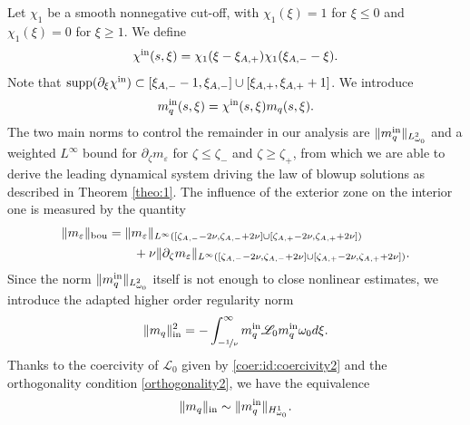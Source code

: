 \documentclass[11pt]{aims}
\theoremstyle{definition}
\newcommand{\ep}{\varepsilon}
\newcommand{\Ls}{\mathscr{L}}
\newcommand{\pa}{\partial}
\newcommand{\inn}{\textup{in}}
\newcommand{\out}{\textup{ex}}
\newcommand{\bd}{\textup{bou}}
\numberwithin{equation}{section}
\begin{document}
Let $\chi_1$ be a smooth nonnegative cut-off, with $\chi_1(\xi)=1$ for $\xi\leq 0$ and $\chi_1(\xi)=0$ for $\xi\geq 1$. We define
$$
 \chi^\inn (s,\xi)=\chi_1(\xi-\xi_{A,+})\chi_1(\xi_{A,-}-\xi).
$$
Note that $\textup{supp}(\pa_\xi \chi^\inn)\subset [\xi_{A,-}-1,\xi_{A,-}]\cup [\xi_{A,+},\xi_{A,+}+1]$. We introduce
\begin{equation}\label{def:chi_inn}
 m_q^\inn (s,\xi) = \chi^\inn (s,\xi) m_q (s,\xi).
\end{equation}
The two main norms to control the remainder in our analysis are $\|m_q^\inn\|_{L^2_{\omega_0}}$ and a weighted $L^\infty$ bound for $\pa_\zeta m_\varepsilon$ for $\zeta\leq \zeta_{-}$ and $\zeta \geq \zeta_+$, from which we are able to derive the leading dynamical system driving the law of blowup solutions as described in Theorem \ref{theo:1}. The influence of the exterior zone on the interior one is measured by the  quantity
\begin{align} \label{def:boundarynorm}
\| m_\varepsilon \|_{\bd}& = \| m_\varepsilon \|_{L^\infty( [\zeta_{A,-}-2\nu,\zeta_{A,-}+2\nu]\cup [\zeta_{A,+}-2\nu,\zeta_{A,+}+2\nu ])}\\
\nonumber &\qquad +\nu \| \pa_\zeta m_\varepsilon \|_{L^\infty( [\zeta_{A,-}-2\nu,\zeta_{A,-}+2\nu]\cup [\zeta_{A,+}-2\nu,\zeta_{A,+}+2\nu ])}.
\end{align}
Since the norm $\|m_q^\inn\|_{L^2_{\omega_0}}$ itself is not enough to close nonlinear estimates, we introduce the adapted higher order regularity norm
\begin{equation}\label{def:inn}
\|m_q\|^2_\inn = -\int_{-\nicefrac{1}{\nu}}^\infty  m_q^\inn\Ls_0 m_q^\inn \omega_0 d\xi.
\end{equation}
Thanks to the coercivity of $\Ls_0$ given by \eqref{coer:id:coercivity2} and the orthogonality condition \eqref{orthogonality2}, we have the equivalence 
\begin{equation}\label{eq:normequiv}
\|m_q\|_\inn \sim \| m_q^\inn\|_{H^1_{\omega_0}}. 
\end{equation}
\end{document}
